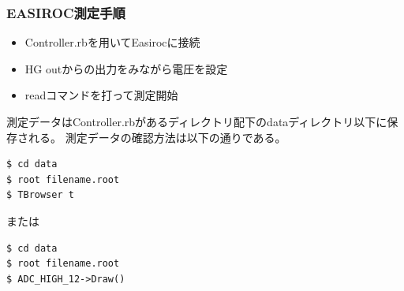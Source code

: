\subsubsection{EASIROC測定手順}
\begin{itemize}
  \item Controller.rbを用いてEasirocに接続
  \item HG outからの出力をみながら電圧を設定
  \item readコマンドを打って測定開始
\end{itemize}
測定データはController.rbがあるディレクトリ配下のdataディレクトリ以下に保存される。
測定データの確認方法は以下の通りである。
\begin{lstlisting}
$ cd data
$ root filename.root
$ TBrowser t
\end{lstlisting}
または
\begin{lstlisting}
$ cd data
$ root filename.root
$ ADC_HIGH_12->Draw()
\end{lstlisting}
